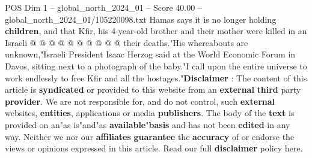 \begin{textsample}{POS Dim 1 – global\_north\_2024\_01 – Score 40.00 – global\_north\_2024\_01/105220098.txt}
Hamas says it is no longer holding \textbf{children}, and that Kfir, his 4-year-old brother and their mother were killed in an Israeli @ @ @ @ @ @ @ @ @ @ their deaths."His whereabouts are unknown,"Israeli President Isaac Herzog said at the World Economic Forum in Davos, sitting next to a photograph of the baby."I call upon the entire universe to work endlessly to free Kfir and all the hostages."\textbf{Disclaimer} : The content of this article is \textbf{syndicated} or provided to this website from an \textbf{external} \textbf{third} party \textbf{provider}.
We are not responsible for, and do not control, such \textbf{external} websites, \textbf{entities}, applications or media \textbf{publishers}.
The body of the \textbf{text} is provided on an"as is"and"as \textbf{available}"\textbf{basis} and has not been \textbf{edited} in any way.
Neither we nor our \textbf{affiliates} \textbf{guarantee} the \textbf{accuracy} of or endorse the views or opinions expressed in this article.
Read our full \textbf{disclaimer} policy here.

\end{textsample}
